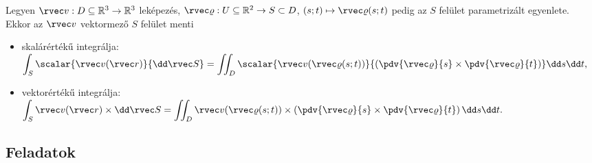 \documentclass[a4paper, 12pt]{scrartcl}
\begin{document}
\vfill

\begin{definition}
  Legyen $\rvec v: D \subseteq \mathbb R^3 \rightarrow \mathbb R^3$ leképezés,
  $\rvec \varrho: U \subseteq \mathbb R^2 \rightarrow S \subset D$, $(s;t)
    \mapsto \rvec \varrho(s;t)$ pedig az $S$ felület parametrizált egyenlete.
  Ekkor az $\rvec v$ vektormező $S$ felület menti
  \begin{itemize}
    \item skalárértékű integrálja:
          \(
            \displaystyle
            \int_S \scalar{\rvec v (\rvec r)}{\dd \rvec S} =
            \iint_D \scalar
            {\rvec v (\rvec \varrho(s; t))}
            {\left(\pdv{\rvec \varrho}{s} \times \pdv{\rvec \varrho}{t}\right)}
            \dd s \dd t
            \text,
          \)
    \item vektorértékű integrálja:
          \(
            \displaystyle
            \int_S \rvec v (\rvec r) \times \dd \rvec S =
            \iint_D {\rvec v (\rvec \varrho(s; t))} \times
            \left(\pdv{\rvec \varrho}{s} \times \pdv{\rvec \varrho}{t}\right)
            \dd s \dd t
            \text.
          \)

  \end{itemize}
\end{definition}

\clearpage
\subsection{Feladatok}
\end{document}
